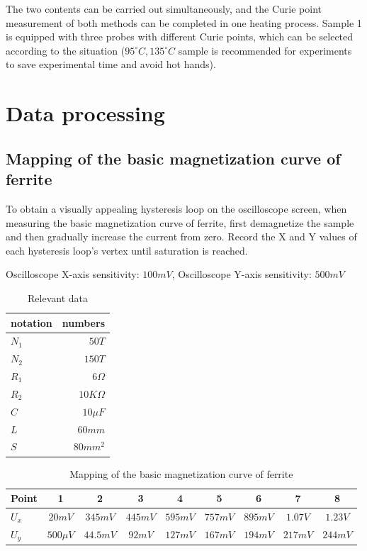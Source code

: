 \documentclass[UTF8]{article}
\begin{document}
	The two contents can be carried out simultaneously, and the Curie point measurement of both methods can be completed in one heating process. Sample 1 is equipped with three probes with different Curie points, which can be selected according to the situation ($95^{\circ}C, 135^{\circ}C$ sample is recommended for experiments to save experimental time and avoid hot hands).
	
	\section{Data processing}
   \subsection{Mapping of the basic magnetization curve of ferrite}
   To obtain a visually appealing hysteresis loop on the oscilloscope screen, when measuring the basic magnetization curve of ferrite, first demagnetize the sample and then gradually increase the current from zero. Record the X and Y values of each hysteresis loop's vertex until saturation is reached.
   
       Oscilloscope X-axis sensitivity: $100mV$, Oscilloscope Y-axis sensitivity: $500mV$
       
   \begin{table}[htbp]
     \centering
     \caption{Relevant data}
       \begin{tabular}{lr}
       \toprule[2pt]
       notation & \multicolumn{1}{l}{numbers} \\
       \midrule
       $N_1$    & $50T$ \\
       $N_2$    & $150T $\\
       $R_1$    & $6\Omega $ \\
       $R_2$   & $10K\Omega$  \\
       $C $    & $10\mu F$ \\
       $L $    & $60mm$ \\
       $S  $   & $80mm^2$ \\
       \bottomrule[2pt]
       \end{tabular}%
     \label{tab:addlabel}%
   \end{table}%
   
  
   \begin{table}[htbp]
     \centering
     \caption{Mapping of the basic magnetization curve of ferrite}
       \begin{tabular}{lcccccccc}
       \toprule[2pt]
       Point & 1     & 2     & 3     & 4     & 5     & 6     & 7     & 8 \\
       \midrule
       $U_x$   & $20mV$    & $345mV$   & $445mV$   & $595mV$   & $757mV$   & $895mV$   & $1.07V$  & $1.23V$ \\
       $U_y$  & $500\mu V$   & $44.5mV$  & $92mV$    & $127mV$   & $167mV$   & $194mV$   & $217mV$   & $244mV$ \\
       \bottomrule[2pt]
       \end{tabular}%
     \label{tab:addlabel}%
   \end{table}%
   
\end{document}
